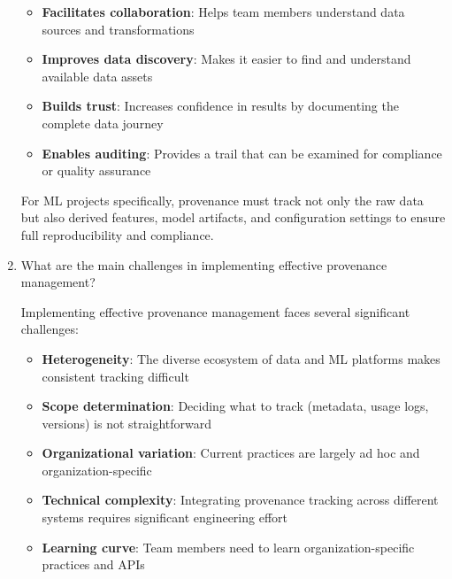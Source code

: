 \documentclass[12pt]{article}
\begin{document}
\begin{enumerate}
\begin{tcolorbox}[colback=blue!5!white,colframe=blue!75!black,title={Solution}]
\begin{itemize}
        \item \textbf{Facilitates collaboration}: Helps team members understand data sources and transformations
        
        \item \textbf{Improves data discovery}: Makes it easier to find and understand available data assets
        
        \item \textbf{Builds trust}: Increases confidence in results by documenting the complete data journey
        
        \item \textbf{Enables auditing}: Provides a trail that can be examined for compliance or quality assurance
    \end{itemize}
    
    For ML projects specifically, provenance must track not only the raw data but also derived features, model artifacts, and configuration settings to ensure full reproducibility and compliance.
    \end{tcolorbox}
    
    \item What are the main challenges in implementing effective provenance management?
    
    \begin{tcolorbox}[colback=blue!5!white,colframe=blue!75!black,title={Solution}]
    Implementing effective provenance management faces several significant challenges:
    
    \begin{itemize}
        \item \textbf{Heterogeneity}: The diverse ecosystem of data and ML platforms makes consistent tracking difficult
        
        \item \textbf{Scope determination}: Deciding what to track (metadata, usage logs, versions) is not straightforward
        
        \item \textbf{Organizational variation}: Current practices are largely ad hoc and organization-specific
        
        \item \textbf{Technical complexity}: Integrating provenance tracking across different systems requires significant engineering effort
        
        \item \textbf{Learning curve}: Team members need to learn organization-specific practices and APIs
        

\end{itemize}
\end{tcolorbox}
\end{enumerate}
\end{document}
